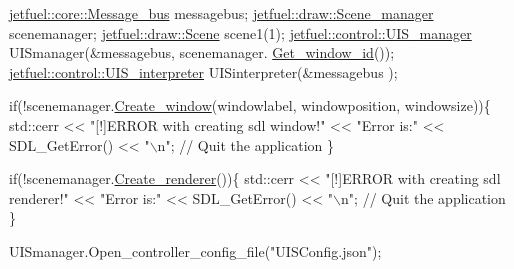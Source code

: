 \begin{DoxyCode}
\hyperlink{classjetfuel_1_1core_1_1Message__bus}{jetfuel::core::Message\_bus} messagebus;
\hyperlink{classjetfuel_1_1draw_1_1Scene__manager}{jetfuel::draw::Scene\_manager} scenemanager;
\hyperlink{classjetfuel_1_1draw_1_1Scene}{jetfuel::draw::Scene} scene1(1);
\hyperlink{classjetfuel_1_1control_1_1UIS__manager}{jetfuel::control::UIS\_manager} UISmanager(&messagebus,
                                      scenemanager.
                                      \hyperlink{classjetfuel_1_1control_1_1UIS__manager_a31b973b02f3a17afed1de151db5704ed}{Get\_window\_id}());
\hyperlink{classjetfuel_1_1control_1_1UIS__interpreter}{jetfuel::control::UIS\_interpreter} UISinterpreter(&messagebus
                                                       );

\textcolor{keywordflow}{if}(!scenemanager.\hyperlink{classjetfuel_1_1draw_1_1Scene__manager_a5113e9062c272a22d383ba872417ba31}{Create\_window}(windowlabel,
                               windowposition,
                               windowsize))\{
     std::cerr << \textcolor{stringliteral}{"[!]ERROR with creating sdl window!"}
     << \textcolor{stringliteral}{"Error is:"} << SDL\_GetError() << \textcolor{stringliteral}{"\(\backslash\)n"};
     \textcolor{comment}{// Quit the application}
\}

\textcolor{keywordflow}{if}(!scenemanager.\hyperlink{classjetfuel_1_1draw_1_1Scene__manager_afafecd926ce5e4b2543a6d583a7d24b6}{Create\_renderer}())\{
     std::cerr << \textcolor{stringliteral}{"[!]ERROR with creating sdl renderer!"}
     << \textcolor{stringliteral}{"Error is:"} << SDL\_GetError() << \textcolor{stringliteral}{"\(\backslash\)n"};
     \textcolor{comment}{// Quit the application}
\}

UISmanager.Open\_controller\_config\_file(\textcolor{stringliteral}{"UISConfig.json"});


\end{DoxyCode}
